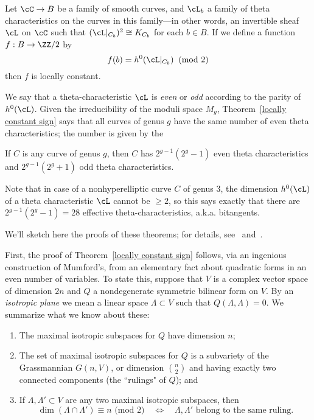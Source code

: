  \begin{theorem}\label{locally constant sign} Let $\cC \to B$ be a family of smooth curves, and $\cL_b$ a family of theta characteristics on the curves in this family---in other words, an invertible sheaf $\cL$ on $\cC$ such that $(\cL|_{C_b})^2 \cong K_{C_b}$ for each $b \in B$. If we define a function $f : B \to \ZZ/2$  by
 $$
 f(b) = h^0(\cL|_{C_b}) \;  \; (\text{mod } 2)
 $$
then $f$ is locally constant.
\end{theorem}

We say that a theta-characteristic $\cL$ is \emph{even} or \emph{odd} according to the parity of $h^0(\cL)$. Given the irreducibility of the moduli space $M_g$,  Theorem~\ref{locally constant sign} says that all curves of genus $g$ have the same number of even theta characteristics; the number is given by the 

\begin{theorem}\label{number of theta characteristics}
If $C$ is any curve of genus $g$, then $C$ has $2^{g-1}(2^g - 1)$ even theta characteristics and $2^{g-1}(2^g+1)$ odd theta characteristics.
\end{theorem}

Note that in case of a nonhyperelliptic curve $C$ of genus 3, the dimension $h^0(\cL)$ of a theta characteristic $\cL$ cannot be $\geq 2$, so this says exactly that there are $2^{g-1}(2^g-1) = 28$ effective theta-characteristics, a.k.a. bitangents.

We'll sketch here the proofs of these theorems; for details, see~\cite{Mumford paper} and~\cite{JH paper}. 

First, the proof of Theorem~\ref{locally constant sign} follows, via an ingenious construction of Mumford's, from an elementary fact about quadratic forms in an even number of variables. To state this, suppose that $V$ is a complex vector space of dimension $2n$ and $Q$ a nondegenerate symmetric bilinear form on $V$. By an \emph{isotropic plane} we mean a linear space $\Lambda \subset V$ such that $Q(\Lambda, \Lambda) = 0$. We summarize what we know about these:

\begin{enumerate}
\item The maximal isotropic subspaces for $Q$ have dimension $n$;
\item The set of maximal isotropic subspaces for $Q$ is a subvariety of the Grassmannian $G(n,V)$, or dimension $\binom{n}{2}$ and having exactly two connected components (the ``rulings" of $Q$); and
\item If $\Lambda, \Lambda' \subset V$ are any two maximal isotropic subspaces, then
$$
\dim(\Lambda \cap \Lambda') \equiv n \text{ (mod 2)} \quad \iff \quad \Lambda, \Lambda' \text{ belong to the same ruling.}
$$
\end{enumerate} 

